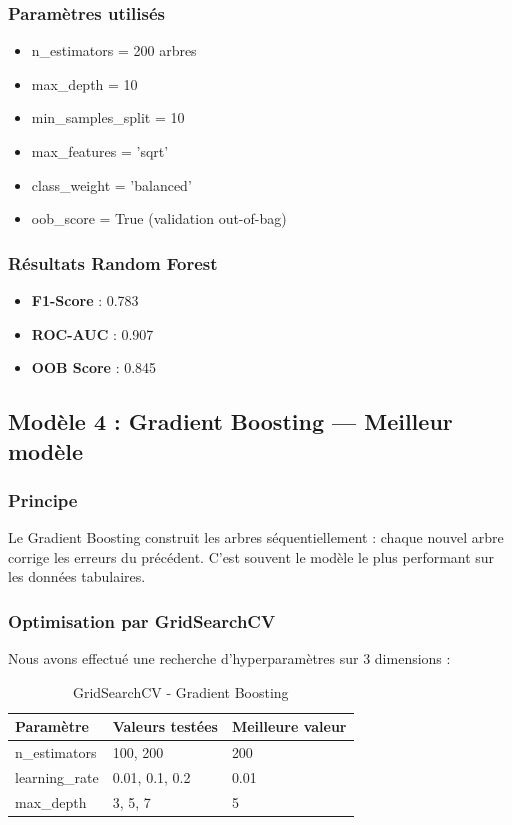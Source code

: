 \documentclass[11pt,a4paper]{article}
\begin{document}
\subsubsection{Paramètres utilisés}
\begin{itemize}
    \item n\_estimators = 200 arbres
    \item max\_depth = 10
    \item min\_samples\_split = 10
    \item max\_features = 'sqrt'
    \item class\_weight = 'balanced'
    \item oob\_score = True (validation out-of-bag)
\end{itemize}

\subsubsection{Résultats Random Forest}
\begin{itemize}
    \item \textbf{F1-Score} : 0.783
    \item \textbf{ROC-AUC} : 0.907
    \item \textbf{OOB Score} : 0.845
\end{itemize}

\subsection{Modèle 4 : Gradient Boosting — Meilleur modèle}

\subsubsection{Principe}
Le Gradient Boosting construit les arbres séquentiellement : chaque nouvel arbre 
corrige les erreurs du précédent. C'est souvent le modèle le plus performant sur 
les données tabulaires.

\subsubsection{Optimisation par GridSearchCV}
Nous avons effectué une recherche d'hyperparamètres sur 3 dimensions :

\begin{table}[H]
\centering
\begin{tabular}{L{4cm} C{3cm} C{3cm}}
\toprule
\textbf{Paramètre} & \textbf{Valeurs testées} & \textbf{Meilleure valeur} \\
\midrule
n\_estimators & 100, 200 & 200 \\
learning\_rate & 0.01, 0.1, 0.2 & 0.01 \\
max\_depth & 3, 5, 7 & 5 \\
\bottomrule
\end{tabular}
\caption{GridSearchCV - Gradient Boosting}
\end{table}
\end{document}
